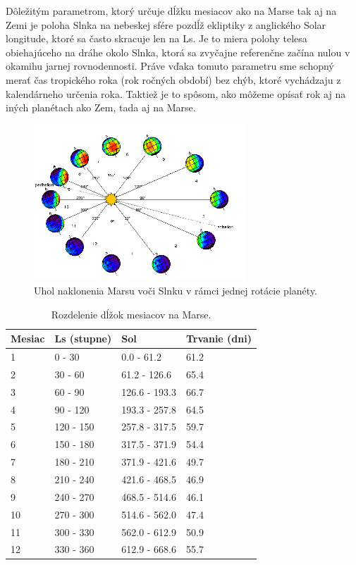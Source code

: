 Dôležitým parametrom, ktorý určuje dĺžku mesiacov ako na Marse tak aj na Zemi je poloha Slnka na nebeskej sfére pozdĺž ekliptiky z anglického Solar longitude, ktoré sa často skracuje len na Ls. Je to miera polohy telesa obiehajúceho na dráhe okolo Slnka, ktorá sa zvyčajne referenčne začína nulou v okamihu jarnej rovnodennosti. Práve vďaka tomuto parametru sme schopný merať čas tropického roka (rok ročných období) bez chýb, ktoré vychádzaju z kalendárneho určenia roka. Taktiež je to spôsom, ako môžeme opísať rok aj na iných planétach ako Zem, tada aj na Marse.
\begin{figure}[!htbp]
  \centering
  \includegraphics[width=8cm]{img/orbit.png}
  \caption{Uhol naklonenia Marsu voči Slnku v rámci jednej rotácie planéty.}
  \label{solarLS}
\end{figure}

\begin{table}[!htbp]
\caption{Rozdelenie dĺžok mesiacov na Marse.}
\label{mesiace_dlzka}
\centering
\begin{tabular}{|l|l|l|l|}
\hline 
Mesiac  & Ls (stupne)   & Sol            & Trvanie (dni)    \\ \hline
1       & 0 - 30        & 0.0 - 61.2     & 61.2             \\ \hline
2       & 30 - 60       & 61.2 - 126.6   & 65.4             \\ \hline
3       & 60 - 90       & 126.6 - 193.3  & 66.7             \\ \hline
4       & 90 - 120      & 193.3 - 257.8  & 64.5             \\ \hline
5       & 120 - 150     & 257.8 - 317.5  & 59.7             \\ \hline
6       & 150 - 180     & 317.5 - 371.9  & 54.4             \\ \hline
7       & 180 - 210     & 371.9 - 421.6  & 49.7             \\ \hline
8       & 210 - 240     & 421.6 - 468.5  & 46.9             \\ \hline
9       & 240 - 270     & 468.5 - 514.6  & 46.1             \\ \hline
10      & 270 - 300     & 514.6 - 562.0  & 47.4             \\ \hline
11      & 300 - 330     & 562.0 - 612.9  & 50.9             \\ \hline
12      & 330 - 360     & 612.9 - 668.6  & 55.7             \\ \hline                                        
\end{tabular}
\end{table}

